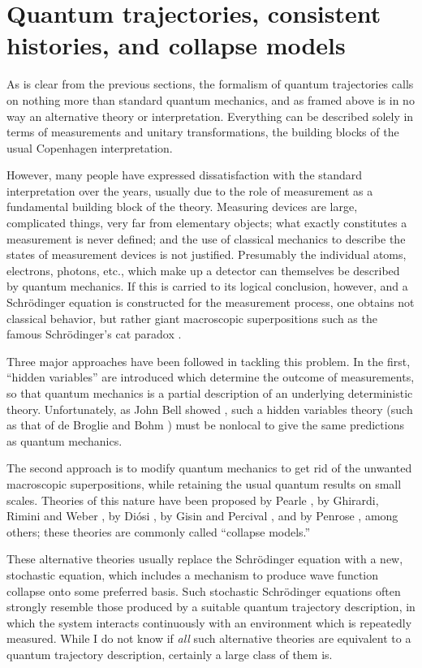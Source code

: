 \documentclass[12pt]{article}
\begin{document}
\section{Quantum trajectories, consistent \\ histories, and collapse models}

As is clear from the previous sections, the formalism of quantum
trajectories calls on nothing more than standard quantum mechanics,
and as framed above is in no way an alternative theory or interpretation.
Everything can be described solely in terms of measurements and unitary
transformations, the building blocks of the usual Copenhagen interpretation.

However, many people have expressed dissatisfaction with the
standard interpretation over the years, usually due to
the role of measurement as a fundamental
building block of the theory.  Measuring devices are large, complicated
things, very far from elementary objects; what exactly constitutes a
measurement is never defined; and the use of classical mechanics to
describe the states of measurement devices is not justified.  Presumably
the individual atoms, electrons, photons, etc., which make up a detector
can themselves be described by quantum mechanics.  If this is carried to
its logical conclusion, however, and a Schr\"odinger equation is
constructed for the measurement process, one obtains not classical
behavior, but rather giant macroscopic superpositions such as the famous
Schr\"odinger's cat paradox \cite{Schroedinger}.

Three major approaches have been followed in tackling this problem.  In the
first, ``hidden variables'' are introduced which determine the outcome of
measurements, so that quantum mechanics is a partial description of an
underlying deterministic theory.  Unfortunately, as John Bell showed
\cite{Bell}, such a hidden variables theory
(such as that of de Broglie and Bohm \cite{Bohm}) must
be nonlocal to give the same predictions as quantum mechanics.

The second approach is to modify quantum mechanics to get rid of the
unwanted macroscopic superpositions, while retaining the usual quantum
results on small scales.  Theories of this nature have been proposed by
Pearle \cite{Pearle}, by Ghirardi, Rimini and Weber \cite{GRW},
by Di\'osi \cite{Diosi}, by Gisin \cite{Gisin1} and Percival \cite{Percival2},
and by Penrose \cite{Penrose}, among others; these theories are commonly
called ``collapse models.''

These alternative theories usually replace the Schr\"odinger equation
with a new, stochastic equation, which includes a mechanism to produce
wave function collapse onto some preferred basis.  Such stochastic
Schr\"odinger equations often strongly resemble those produced by a
suitable quantum trajectory description, in which the system interacts
continuously with an environment which is repeatedly measured.  While
I do not know if {\it all} such alternative theories are equivalent to a
quantum trajectory description, certainly a large class of them is.
\end{document}
